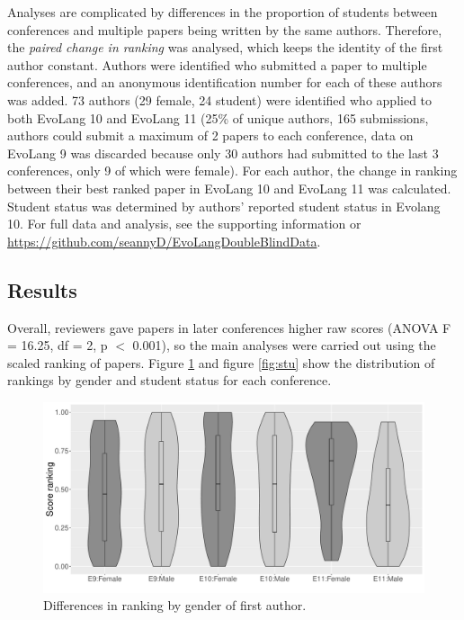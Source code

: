 \documentclass[12pt]{article}
\begin{document}
Analyses are complicated by differences in the proportion of students between conferences and multiple papers being written by the same authors.  Therefore, the \emph{paired change in ranking} was analysed, which keeps the identity of the first author constant.  Authors were identified who submitted a paper to multiple conferences, and an anonymous identification number for each of these authors was added.  73 authors (29 female, 24 student) were identified who applied to both EvoLang 10 and EvoLang 11 (25\% of unique authors, 165 submissions, authors could submit a maximum of 2 papers to each conference, data on EvoLang 9 was discarded because only 30 authors had submitted to the last 3 conferences, only 9 of which were female).  For each author, the change in ranking between their best ranked paper in EvoLang 10 and EvoLang 11 was calculated. Student status was determined by authors' reported student status in Evolang 10.  For full data and analysis, see the supporting information or \url{https://github.com/seannyD/EvoLangDoubleBlindData}.

\subsection{Results}

Overall, reviewers gave papers in later conferences higher raw scores (ANOVA F = 16.25, df = 2, p $<$ 0.001), so the main analyses were carried out using the scaled ranking of papers.  Figure \ref{fig:gen} and figure \ref{fig:stu} show the distribution of rankings by gender and student status for each conference.  

\begin{figure}[htbp]
\begin{center}
\includegraphics[width=130mm]{../Results_Gender_3conf.pdf}

\caption{Differences in ranking by gender of first author.}
\label{fig:gen}
\end{center}
\end{figure}
\end{document}
